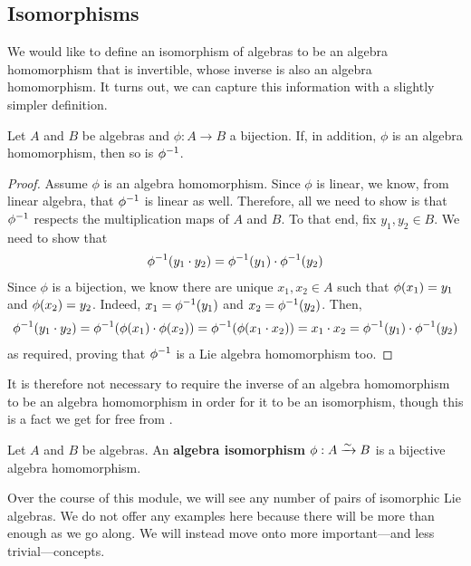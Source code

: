 \subsection{Isomorphisms}

We would like to define an isomorphism of algebras to be an algebra homomorphism that is invertible, whose inverse is also an algebra homomorphism. It turns out, we can capture this information with a slightly simpler definition.

\begin{boxlemma}\label{Ch1:Lemma:Inv_of_Bij_Hom_Alg_Hom}
    Let $A$ and $B$ be algebras and $\phi : A \to B$ a bijection. If, in addition, $\phi$ is an algebra homomorphism, then so is $\phi^{-1}$.
\end{boxlemma}
\begin{proof}
    Assume $\phi$ is an algebra homomorphism. Since $\phi$ is linear, we know, from linear algebra, that $\phi^{-1}$ is linear as well. Therefore, all we need to show is that $\phi^{-1}$ respects the multiplication maps of $A$ and $B$. To that end, fix $y_1, y_2 \in B$. We need to show that
    \begin{align*}
        \phi^{-1}\!\left( y_1 \cdot y_2 \right) = \phi^{-1}\!\left( y_1 \right) \cdot \phi^{-1}\!\left( y_2 \right)
    \end{align*}
    Since $\phi$ is a bijection, we know there are unique $x_1, x_2 \in A$ such that $\phi\!\left( x_1 \right) = y_1$ and $\phi\!\left( x_2 \right) = y_2$. Indeed, $x_1 = \phi^{-1}\!\left( y_1 \right)$ and $x_2 = \phi^{-1}\!\left( y_2 \right)$. Then,
    \begin{align*}
        \phi\inv\of{y_1 \cdot y_2} = \phi\inv\of{\phiof{x_1} \cdot \phiof{x_2}} = \phi\inv\of{\phiof{x_1 \cdot x_2}} = x_1 \cdot x_2 = \phi\inv\of{y_1} \cdot \phi\inv\of{y_2}
    \end{align*}
    as required, proving that $\phi^{-1}$ is a Lie algebra homomorphism too.
\end{proof}

It is therefore not necessary to require the inverse of an algebra homomorphism to be an algebra homomorphism in order for it to be an isomorphism, though this is a fact we get for free from .

\begin{boxdefinition}
    Let $A$ and $B$ be algebras. An \textbf{algebra isomorphism} $\phi : A \xrightarrow{\sim} B$ is a bijective algebra homomorphism.
\end{boxdefinition}

Over the course of this module, we will see any number of pairs of isomorphic Lie algebras. We do not offer any examples here because there will be more than enough as we go along. We will instead move onto more important---and less trivial---concepts.

